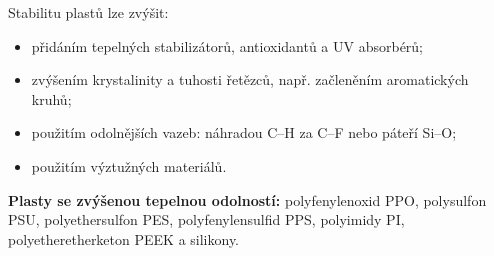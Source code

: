 Stabilitu plastů lze zvýšit:
\begin{itemize}
\item přidáním tepelných stabilizátorů, antioxidantů a UV absorbérů;
\item zvýšením krystalinity a tuhosti řetězců, např. začleněním aromatických kruhů;
\item použitím odolnějších vazeb: náhradou C--H za C--F nebo páteří Si--O;
\item použitím výztužných materiálů.
\end{itemize}
\textbf{Plasty se zvýšenou tepelnou odolností:} polyfenylenoxid PPO, polysulfon PSU, polyethersulfon PES, polyfenylensulfid PPS, polyimidy PI, polyetheretherketon PEEK a silikony.
